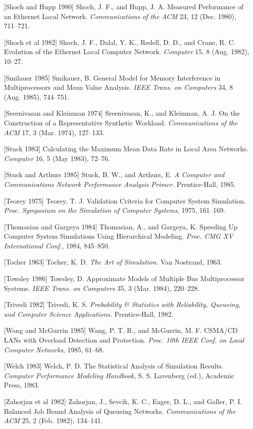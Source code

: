 [Shoch and Hupp 1980] Shoch, J. F., and Hupp, J. A. Measured Performance of an Ethernet Local Network. \textit{Communications of the ACM} 23, 12 (Dec. 1980), 711--721.

[Shoch et al 1982] Shoch, J. F., Dalal, Y. K., Redell, D. D., and Crane, R. C. Evolution of the Ethernet Local Computer Network. \textit{Computer} 15, 8 (Aug. 1982), 10--27.

[Smilauer 1985] Smikauer, B. General Model for Memory Interference in Multiprocessors and Mean Value Analysis. \textit{IEEE Trans. on Computers} 34, 8 (Aug. 1985), 744--751.

[Sreenivasan and Kleinman 1974] Sreenivasan, K., and Kleinman, A. J. On the Construction of a Representative Synthetic Workload. \textit{Communications of the ACM} 17, 3 (Mar. 1974), 127--133.

[Stuck 1983] Calculating the Maximum Mean Data Rate in Local Area Networks. \textit{Computer} 16, 5 (May 1983), 72--76.

[Stuck and Arthurs 1985] Stuck, B. W., and Arthurs, E. \textit{A Computer and Communications Network Performance Analysis Primer.} Prentice-Hall, 1985.

[Teorey 1975] Teorey, T. J. Validation Criteria for Computer System Simulation. \textit{Proc. Symposium on the Simulation of Computer Systems}, 1975, 161--169.

[Thomasian and Gargeya 1984] Thomasian, A., and Gargeya, K. Speeding Up Computer System Simulations Using Hierarchical Modeling. \textit{Proc. CMG XV International Conf.}, 1984, 845--850.

[Tocher 1963] Tocher, K. D. \textit{The Art of Simulation.} Van Nostrand, 1963.

[Towsley 1986] Towsley, D. Approximate Models of Multiple Bus Multiprocessor Systems. \textit{IEEE Trans. on Computers} 35, 3 (Mar. 1984), 220--228.

[Trivedi 1982] Trivedi, K. S. \textit{Probability \& Statistics with Reliability, Queueing, and Computer Science Applications.} Prentice-Hall, 1982.

[Wang and McGurrin 1985] Wang, P. T. R., and McGurrin, M. F. CSMA/CD LANs with Overload Detection and Protection. \textit{Proc. 10th IEEE Conf. on Local Computer Networks}, 1985, 61--68.

[Welch 1983] Welch, P. D. The Statistical Analysis of Simulation Results. \textit{Computer Performance Modeling Handbook}, S. S. Lavenberg (ed.), Academic Press, 1983.

[Zahorjan et al 1982] Zahorjan, J., Sevcik, K. C., Eager, D. L., and Galler, P. I. Balanced Job Bound Analysis of Queueing Networks. \textit{Communications of the ACM} 25, 2 (Feb. 1982), 134--141.

\endgroup
